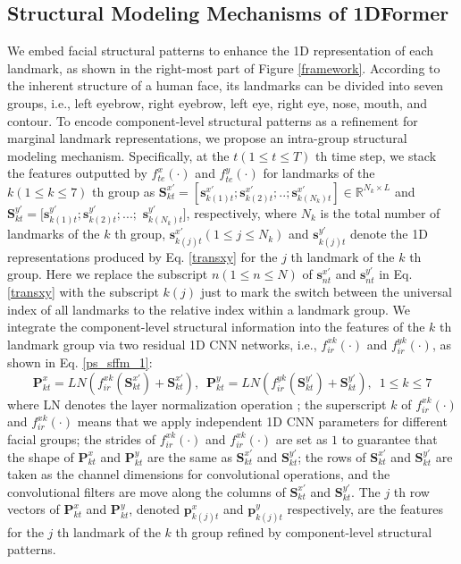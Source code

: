 \documentclass[review]{elsarticle}
\begin{document}
\subsection{Structural Modeling Mechanisms of 1DFormer}
\label{structure}
We embed facial structural patterns to enhance the 1D representation of each landmark, as shown in the right-most part of Figure \ref{framework}. According to the inherent structure of a human face, its landmarks can be divided into seven groups, i.e., left eyebrow, right eyebrow, left eye, right eye, nose, mouth, and contour. 
To encode component-level structural patterns as a refinement for marginal landmark representations, we propose an intra-group structural modeling mechanism. Specifically, at the $t (1\leq t \leq T)$ th time step, we stack the features outputted by $f^x_{te}(\cdot)$ and $f^y_{te}(\cdot)$ for landmarks of the $k  (1 \leq k \leq 7)$ th group as $\textbf{S}^{x'}_{kt}=[\textbf{s}^{x'}_{k(1)t};\textbf{s}^{x'}_{k(2)t};..;\textbf{s}^{x'}_{k(N_k)t}] \in \mathbb{R}^{N_k \times L}$ and $\textbf{S}^{y'}_{kt}=[\textbf{s}^{y'}_{k(1)t};\textbf{s}^{y'}_{k(2)t};...;$ $\textbf{s}^{y'}_{k(N_k)t}]$, respectively, where $N_k$ is the total number of landmarks of the $k$ th group, $\textbf{s}^{x'}_{k(j)t} (1 \leq j \leq N_k)$ and $\textbf{s}^{y'}_{k(j)t}$  denote the 1D representations produced by Eq. \eqref{transxy} for the $j$ th landmark of the $k$ th group. Here we replace the subscript $n (1\leq n \leq N)$ of $\textbf{s}^{x'}_{nt}$  and $\textbf{s}^{y'}_{nt}$ in Eq. \eqref{transxy} with the subscript $k(j)$ just to mark the switch between the universal index of all landmarks to the relative index within a landmark group. We integrate the component-level structural information into the features of the $k$ th landmark group via two residual 1D CNN networks, i.e., $f^{xk}_{ir}(\cdot)$ and $f^{yk}_{ir}(\cdot)$, as shown in Eq. \eqref{ps_sffm_1}:
\begin{equation}
	\label{ps_sffm_1}
	\textbf{P}^{x}_{kt} = LN( f^{xk}_{ir}(\textbf{S}^{x'}_{kt})+\textbf{S}^{x'}_{kt}),\,\,\, \textbf{P}^{y}_{kt} = LN(f^{yk}_{ir}(\textbf{S}^{y'}_{kt})+\textbf{S}^{y'}_{kt}), \,\,\, 1 \leq k \leq 7
\end{equation}
where LN denotes the layer normalization operation \cite{transformer}; the superscript $k$ of $f^{xk}_{ir}(\cdot)$ and $f^{xk}_{ir}(\cdot)$ means that we apply independent 1D CNN parameters for different facial groups; the strides of $f^{xk}_{ir}(\cdot)$ and $f^{xk}_{ir}(\cdot)$ are set as $1$ to guarantee that the shape of  $\textbf{P}^{x}_{kt}$ and $\textbf{P}^{y}_{kt}$ are the same as $\textbf{S}^{x'}_{kt}$ and $\textbf{S}^{y'}_{kt}$; the rows of $\textbf{S}^{x'}_{kt}$ and $\textbf{S}^{y'}_{kt}$ are taken as the channel dimensions for convolutional operations, and the convolutional filters are move along the columns of $\textbf{S}^{x'}_{kt}$ and $\textbf{S}^{y'}_{kt}$. The $j$ th row vectors of $\textbf{P}^{x}_{kt}$ and $\textbf{P}^{y}_{kt}$, denoted $\textbf{p}^{x}_{k(j)t}$ and $\textbf{p}^{y}_{k(j)t}$ respectively, are the features for the $j$ th landmark of the $k$ th group refined by component-level structural patterns.
\end{document}

